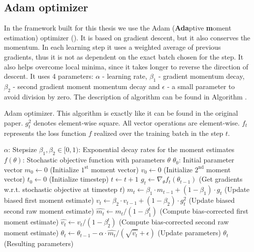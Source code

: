 \subsection{Adam optimizer}
\label{subsec:adam}
In the framework built for this thesis we use the Adam (\textbf {Ada}ptive \textbf{m}oment estimation) optimizer (\cite{adam}). It is based on gradient descent, but it also conserves the momentum. In each learning step it uses a weighted average of previous gradients, thus it is not as dependent on the exact batch chosen for the step. It also helps overcome local minima, since it takes longer to reverse the direction of descent. It uses 4 parameters: $\alpha$ - learning rate, $\beta_1$ - gradient momentum decay, $\beta_2$ - second gradient moment momentum decay and $\epsilon$ - a small parameter to avoid division by zero. The description of algorithm can be found in Algorithm . 
\begin{algorithm}[h]
\caption{Adam optimizer. This algorithm is exactly like it can be found in the original paper. $g_t^2$ denotes element-wise square. All vector operations are element-wise. $f_t$ represents the loss function $f$ realized over the training batch in the step $t$.}
\label{alg:adam}
\begin{algorithmic}
\REQUIRE $\alpha$: Stepsize
\REQUIRE $\beta_1, \beta_2 \in [0,1)$: Exponential decay rates for the moment estimates
\REQUIRE $f(\theta)$: Stochastic objective function with parameters $\theta$
\REQUIRE $\theta_0$: Initial parameter vector
\STATE $m_0 \leftarrow 0$ (Initialize $1^{\text{st}}$ moment vector)
\STATE $v_0 \leftarrow 0$ (Initialize $2^{\text{nd}}$ moment vector)
\STATE $t_0 \leftarrow 0$ (Initialize timestep)
	\STATE $t\leftarrow t+1$
	\STATE $g_t \leftarrow \nabla_\theta f_t(\theta_{t-1})$ (Get gradients w.r.t. stochastic objective at timestep $t$)
	\STATE $m_t\leftarrow \beta_1\cdot m_{t-1}+(1-\beta_1)\cdot g_t$ (Update biased first moment estimate)
	\STATE $v_t\leftarrow \beta_2\cdot v_{t-1}+(1-\beta_2)\cdot g_t^2$ (Update biased second raw moment estimate)
	\STATE $\widehat{m_t}\leftarrow m_t/(1-\beta_1^t)$ (Compute bias-corrected first moment estimate)
	\STATE $\widehat{v_t}\leftarrow v_t/(1-\beta_2^t)$ (Compute bias-corrected second raw moment estimate)
	\STATE $\theta_t\leftarrow\theta_{t-1}-\alpha\cdot \widehat{m_t}/(\sqrt{\widehat{v_t}}+\epsilon)$ (Update parameters)
\ENDWHILE
\RETURN $\theta_t$ (Resulting parameters)
\end{algorithmic}
\end{algorithm}

